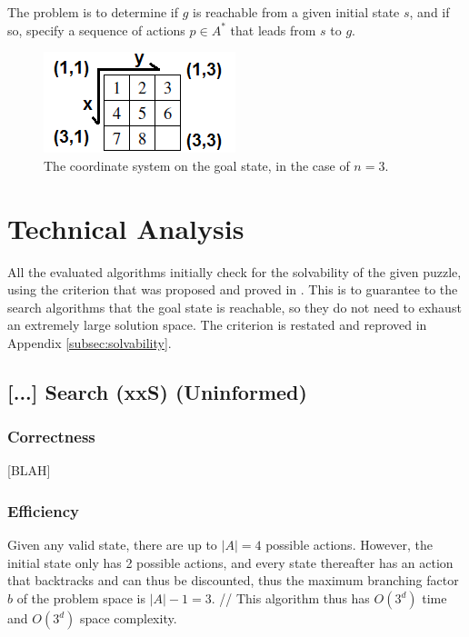 \documentclass[runningheads]{llncs}
\begin{document}
The problem is to determine if $g$ is reachable from a given initial state $s$, and if so, specify a sequence of actions $p \in A^\ast$ that leads from $s$ to $g$.



\begin{figure}
	\centering
	\includegraphics{coord_system.png}
	\caption{The coordinate system on the goal state, in the case of $n=3$.} \label{fig:coordsystem}
\end{figure}



\section{Technical Analysis}
All the evaluated algorithms initially check for the solvability of the given puzzle, using the criterion that was proposed and proved in \cite{Solvability}. This is to guarantee to the search algorithms that the goal state is reachable, so they do not need to exhaust an extremely large solution space.
The criterion is restated and reproved in Appendix \ref{subsec:solvability}.

\subsection{[...] Search (xxS) (Uninformed)}
\subsubsection{Correctness}
[BLAH]

\subsubsection{Efficiency}
Given any valid state, there are up to $|A|=4$ possible actions. However, the initial state only has 2 possible actions, and every state thereafter has an action that backtracks and can thus be discounted, thus the maximum branching factor $b$ of the problem space is $|A|-1=3$. // This algorithm thus has $O(3^d)$ time and $O(3^d)$ space complexity.
\end{document}

